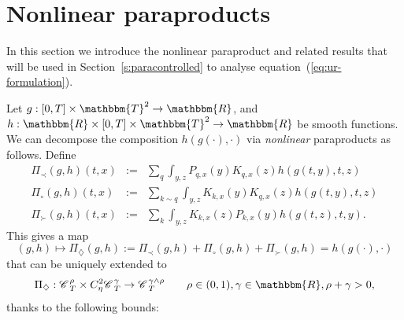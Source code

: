 \documentclass[11pt,reqno]{amsart}
\newcommand{\assign}{:=}
\newcommand{\cdummy}{\cdot}
\newcommand{\nocomma}{}
\newcommand{\tmtextit}[1]{{\itshape{#1}}}
\newcommand{\CC}{\mathscr{C} \hspace{.1em}}
\begin{document}
\section{Nonlinear paraproducts}\label{s:nonlinear}

In this section we introduce the nonlinear paraproduct and related results
that will be used in Section~\ref{s:paracontrolled} to analyse
equation~(\ref{eq:ur-formulation}).

Let $g : [0, T] \times \mathbbm{T}^2 \rightarrow \mathbbm{R}$, and $h :
\mathbbm{R} \times [0, T] \times \mathbbm{T}^2 \rightarrow \mathbbm{R}$ be
smooth functions. We can decompose the composition $h (g (\cdummy), \cdummy)$
via \tmtextit{nonlinear} paraproducts as follows. Define
\begin{eqnarray}
  \Pi_{\prec} (g, h) (t, x) & \assign & \sum_q \int_{y, z} P_{q, x} (y) K_{q,
  x} (z) h (g (t, y), t, z)  \label{e:nonlin-par-small}\\
  \Pi_{\circ} (g, h) (t, x) & \assign & \sum_{k \sim q} \int_{y, z} K_{k, x}
  (y) K_{q, x} (z) h (g (t, y), t, z)  \label{e:nonlin-par-same}\\
  \Pi_{\succ} (g, h) (t, x) & \assign & \sum_k \int_{y, z} K_{k, x} (z) P_{k,
  x} (y) h (g (t, z), t, y) .  \label{e:nonlin-par-big}
\end{eqnarray}
This gives a map
\begin{equation}
  (g, h) \mapsto \Pi_{\nocomma \diamondsuit} (g, h) \assign \Pi_{\prec} (g, h)
  + \Pi_{\circ} (g, h) + \Pi_{\succ} (g, h) = h (g (\cdot), \cdot) 
  \label{e:nonlin-decomp}
\end{equation}
that can be uniquely extended to
\[ \Pi_{\diamondsuit} : \CC_T^{\rho} \times C^2_{\eta} \CC_T^{\gamma}
   \rightarrow \CC_T^{\gamma \wedge \rho} \qquad \rho \in (0, 1), \gamma \in
   \mathbbm{R}, \rho + \gamma > 0, \]
thanks to the following bounds:
\end{document}
